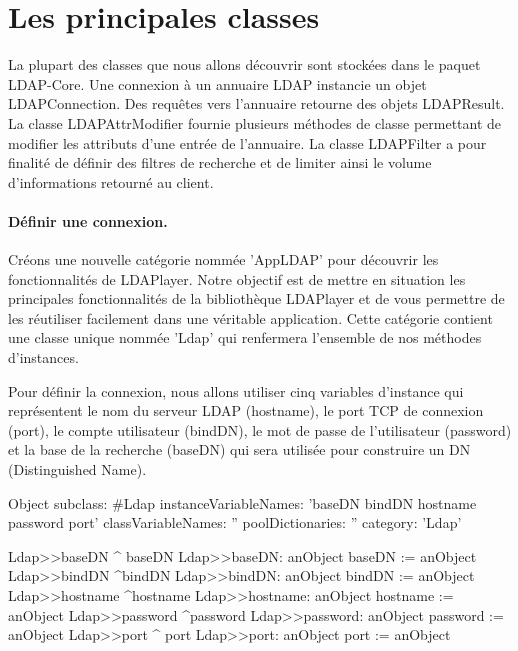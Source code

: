 \documentclass[a4paper,10pt,twoside]{book}
\begin{document}
\section{Les principales classes}

La plupart des classes que nous allons d\'ecouvrir sont stock\'ees dans le paquet LDAP-Core. Une connexion \`a un annuaire LDAP instancie un objet LDAPConnection. Des requ\^etes vers l'annuaire retourne des objets LDAPResult. La classe LDAPAttrModifier fournie plusieurs m\'ethodes de classe permettant de modifier les attributs d'une entr\'ee de l'annuaire. La classe LDAPFilter a pour finalit\'e de d\'efinir des filtres de recherche et de limiter ainsi le volume d'informations retourn\'e au client.




\paragraph{D\'efinir une connexion.}
Cr\'eons une nouvelle cat\'egorie nomm\'ee 'AppLDAP' pour d\'ecouvrir les fonctionnalit\'es de LDAPlayer. Notre objectif est de mettre en situation les principales fonctionnalit\'es de la biblioth\`eque LDAPlayer et de vous permettre de les r\'eutiliser facilement dans une v\'eritable application. Cette cat\'egorie contient une classe unique nomm\'ee 'Ldap' qui renfermera l'ensemble de nos m\'ethodes d'instances.


Pour d\'efinir la connexion, nous allons utiliser cinq variables d'instance qui repr\'esentent le nom du serveur LDAP (hostname), le port TCP de connexion (port), le compte utilisateur (bindDN), le mot de passe de l'utilisateur (password) et la base de la recherche (baseDN) qui sera utilis\'ee pour construire un DN (Distinguished Name).

\begin{code}{}
Object subclass: #Ldap 
	instanceVariableNames: 'baseDN bindDN hostname password port'
	classVariableNames: '' 
	poolDictionaries: '' 
	category: 'Ldap'
\end{code}

\begin{code}{}
Ldap>>baseDN 
	^ baseDN
Ldap>>baseDN: anObject 
	baseDN := anObject
Ldap>>bindDN 
	^bindDN
Ldap>>bindDN: anObject 
	bindDN := anObject
Ldap>>hostname 
	^hostname
Ldap>>hostname: anObject 
	hostname := anObject
Ldap>>password 
	^password
Ldap>>password: anObject 
	password := anObject
Ldap>>port 
	^ port
Ldap>>port: anObject 
	port := anObject
\end{code}
\end{document}
